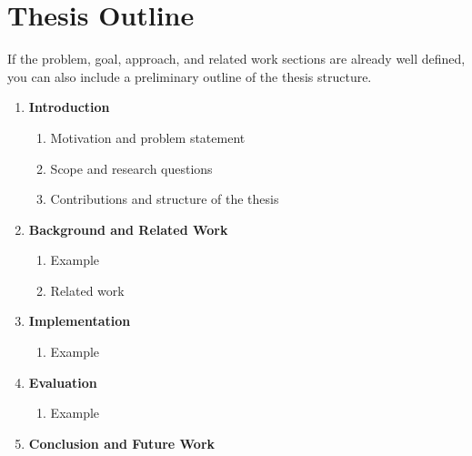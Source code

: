 \section*{Thesis Outline}
\label{sec:outline}

If the problem, goal, approach, and related work sections are already well defined, you can also include a preliminary outline of the thesis structure.

\begin{enumerate}
	\item \textbf{Introduction}
	      \begin{enumerate}
		      \item Motivation and problem statement
		      \item Scope and research questions
		      \item Contributions and structure of the thesis
	      \end{enumerate}

	\item \textbf{Background and Related Work}
	      \begin{enumerate}
		      \item Example
		      \item Related work
	      \end{enumerate}


	\item \textbf{Implementation}
	      \begin{enumerate}
		      \item Example
	      \end{enumerate}

	\item \textbf{Evaluation}
	      \begin{enumerate}
		      \item Example
	      \end{enumerate}

	\item \textbf{Conclusion and Future Work}
\end{enumerate}
